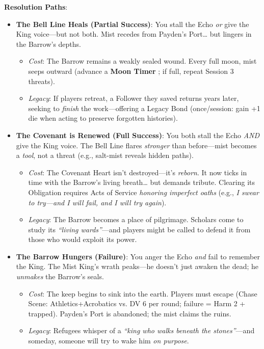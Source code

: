 \documentclass[12pt]{article}
\begin{document}
\textbf{Resolution Paths}:
\begin{itemize}
  \item \textbf{The Bell Line Heals (Partial Success)}: You stall the Echo \textit{or} give the King voice---but not both. Mist recedes from Payden's Port\ldots{} but lingers in the Barrow's depths.
  \begin{itemize}
    \item \textit{Cost}: The Barrow remains a weakly sealed wound. Every full moon, mist seeps outward (advance a \textbf{Moon Timer }; if full, repeat Session 3 threats).
    \item \textit{Legacy}: If players retreat, a Follower they saved returns years later, seeking to \textit{finish} the work---offering a Legacy Bond (once/session: gain +1 die when acting to preserve forgotten histories).
  \end{itemize}
  \item \textbf{The Covenant is Renewed (Full Success)}: You both stall the Echo \textit{AND} give the King voice. The Bell Line flares \textit{stronger} than before---mist becomes a \textit{tool}, not a threat (e.g., salt-mist reveals hidden paths).
  \begin{itemize}
    \item \textit{Cost}: The Covenant Heart isn't destroyed---it's \textit{reborn}. It now ticks in time with the Barrow's living breath\ldots{} but demands tribute. Clearing its Obligation requires Acts of Service \textit{honoring imperfect oaths} (e.g., \textit{I swear to try---and I will fail, and I will try again}).
    \item \textit{Legacy}: The Barrow becomes a place of pilgrimage. Scholars come to study its \textit{``living wards''}---and players might be called to defend it from those who would exploit its power.
  \end{itemize}
  \item \textbf{The Barrow Hungers (Failure)}: You anger the Echo \textit{and} fail to remember the King. The Mist King's wrath peaks---he doesn't just awaken the dead; he \textit{unmakes} the Barrow's seals.
  \begin{itemize}
    \item \textit{Cost}: The keep begins to sink into the earth. Players must escape (Chase Scene: Athletics+Acrobatics vs. DV 6 per round; failure = Harm 2 + trapped). Payden's Port is abandoned; the mist claims the ruins.
    \item \textit{Legacy}: Refugees whisper of a \textit{``king who walks beneath the stones''}---and someday, someone will try to wake him \textit{on purpose}.
  \end{itemize}
\end{itemize}
\end{document}
